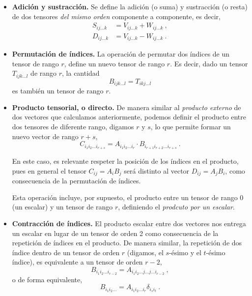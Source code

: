 \begin{itemize}
    \item \textbf{Adición y sustracción.} Se define la adición (o suma) y sustracción (o resta) de dos tensores \emph{del mismo orden} componente a componente, es decir,
    \begin{align}
        S_{ij \dots k} & = V_{ij \dots k} + W_{ij \dots k} \ , \\
        D_{ij \dots k} & = V_{ij \dots k} - W_{ij \dots k} \ .
    \end{align}
    \item \textbf{Permutación de índices.} La operación de permutar dos índices de un tensor de rango $r$, define un nuevo tensor de rango $r$. Es decir, dado un tensor $T_{ijk \dots l}$ de rango $r$, la cantidad
    \begin{equation}
        B_{ijk \dots l} = T_{ikj \dots l} 
    \end{equation}
    es también un tensor de rango $r$.

    \item \textbf{Producto tensorial, o directo.} De manera similar al \emph{producto externo} de dos vectores que calculamos anteriormente, podemos definir el producto entre dos tensores de diferente rango, digamos $r$ y $s$, lo que permite formar un nuevo vector de rango $r+s$,
    \begin{equation}
        C_{i_1 i_2 \dots i_{r+s}} = A_{i_1 i_2 \dots i_r} \cdot B_{i_{r+1} i_{r+2} \dots i_{r+s}} \ .
    \end{equation}
    
    En este caso, es relevante respeter la posición de los índices en el producto, pues en general el tensor $C_{ij} = A_i B_j$ será distinto al vector $D_{ij} = A_j B_i$, como consecuencia de la permutación de índices.

    Esta operación incluye, por supuesto, el producto entre un tensor de rango 0 (un escalar) y un tensor de rango $r$, definiendo el \emph{prodcuto por un escalar}.

    \item \textbf{Contracción de índices.} El producto escalar entre dos vectores nos entrega un escalar en lugar de un tensor de orden 2 como consecuencia de la repetición de índices en el producto. De manera similar, la repetición de dos índice dentro de un tensor de orden $r$ (digamos, el $s$-ésimo y el $t$-ésimo índice), es equivalente a un tensor de orden $r-2$,
    \begin{equation}
        B_{i_1 i_2 \dots i_{r-2}} = A_{i_1 i_2 \dots j \dots j \dots i_{r-2}} \ ,
    \end{equation}
    o de forma equivalente,
    \begin{equation}
        B_{i_1 i_2 \dots} = A_{i_1 i_2 \dots i_r} \delta_{i_s i_t} \ .
    \end{equation}


\end{itemize}
